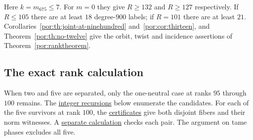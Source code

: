 \documentclass[11pt,a4paper]{article}
\numberwithin{equation}{section}
\theoremstyle{remark}
\begin{document}
Here $k=m_{675}\le7$. For $m=0$ they give $R\ge132$ and $R\ge127$ respectively. If $R\le105$ there are at least $18$ degree-$900$ labels; if $R=101$ there are at least $21$. Corollaries~\ref{por:th:joint-at-ninehundred} and~\ref{por:cor:thirteen}, and Theorem~\ref{por:th:no-twelve} give the orbit, twist and incidence assertions of Theorem~\ref{por:ranktheorem}.
\subsection{The exact rank calculation}
\label{por:certificate}
When two and five are separated, only the one-neutral case at ranks $95$ through $100$ remains. The \href{https://github.com/sebastienpalcoux/WGT-fusion-categories/blob/f7f9f9a02f3116e61eb9dca4eebfed77001494e8/code/check_frontier_rank.py}{integer recursions} below enumerate the candidates. For each of the five survivors at rank $100$, the \href{https://github.com/sebastienpalcoux/WGT-fusion-categories/blob/f7f9f9a02f3116e61eb9dca4eebfed77001494e8/certificates/certificates.json}{certificates} give both disjoint fibers and their norm witnesses. A \href{https://github.com/sebastienpalcoux/WGT-fusion-categories/blob/f7f9f9a02f3116e61eb9dca4eebfed77001494e8/code/verify_witnesses.py}{separate calculation} checks each pair. The argument on tame phases excludes all five. 
\end{document}
